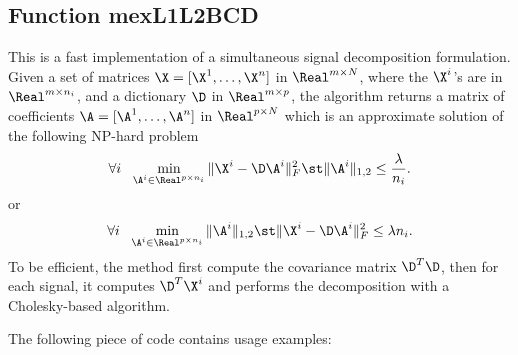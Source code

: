 \documentclass[a4paper, 11pt]{article}
\begin{document}
\subsection{Function mexL1L2BCD}
This is a fast implementation of a simultaneous signal decomposition formulation. Given a set of matrices $\X=[\X^1,\ldots,\X^n]$  in $\Real^{m \times N}$, where the $\X^i$'s are in $\Real^{m \times n_i}$, and a dictionary $\D$ in $\Real^{m \times p}$, the algorithm returns a matrix of coefficients $\A=[\A^1,\ldots,\A^n]$ in $\Real^{p \times N}$ which is an approximate solution of the following NP-hard problem
\begin{equation}
\forall i~~ \min_{\A^i \in \Real^{p \times n_i}} \|\X^i-\D\A^i\|_F^2 \st \|\A^i\|_{1,2} \leq \frac{\lambda}{n_i}.
\end{equation}
or 
\begin{equation}
\forall i~~ \min_{\A^i \in \Real^{p \times n_i}}  \|\A^i\|_{1,2} \st \|\X^i-\D\A^i\|_F^2 \leq \lambda n_i.
\end{equation}
To be efficient, the method first compute the covariance matrix $\D^T\D$, then for each signal, it computes $\D^T\X^i$ and performs the decomposition with a Cholesky-based algorithm.

%    

The following piece of code contains usage examples:

\end{document}
